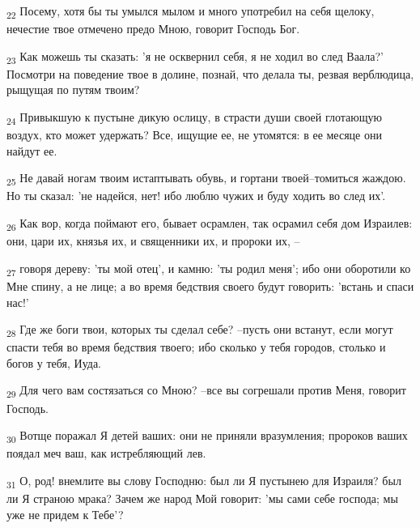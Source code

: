 \begin{tcolorbox}
\textsubscript{22} Посему, хотя бы ты умылся мылом и много употребил на себя щелоку, нечестие твое отмечено предо Мною, говорит Господь Бог.
\end{tcolorbox}
\begin{tcolorbox}
\textsubscript{23} Как можешь ты сказать: 'я не осквернил себя, я не ходил во след Ваала?' Посмотри на поведение твое в долине, познай, что делала ты, резвая верблюдица, рыщущая по путям твоим?
\end{tcolorbox}
\begin{tcolorbox}
\textsubscript{24} Привыкшую к пустыне дикую ослицу, в страсти души своей глотающую воздух, кто может удержать? Все, ищущие ее, не утомятся: в ее месяце они найдут ее.
\end{tcolorbox}
\begin{tcolorbox}
\textsubscript{25} Не давай ногам твоим истаптывать обувь, и гортани твоей--томиться жаждою. Но ты сказал: 'не надейся, нет! ибо люблю чужих и буду ходить во след их'.
\end{tcolorbox}
\begin{tcolorbox}
\textsubscript{26} Как вор, когда поймают его, бывает осрамлен, так осрамил себя дом Израилев: они, цари их, князья их, и священники их, и пророки их, --
\end{tcolorbox}
\begin{tcolorbox}
\textsubscript{27} говоря дереву: 'ты мой отец', и камню: 'ты родил меня'; ибо они оборотили ко Мне спину, а не лице; а во время бедствия своего будут говорить: 'встань и спаси нас!'
\end{tcolorbox}
\begin{tcolorbox}
\textsubscript{28} Где же боги твои, которых ты сделал себе? --пусть они встанут, если могут спасти тебя во время бедствия твоего; ибо сколько у тебя городов, столько и богов у тебя, Иуда.
\end{tcolorbox}
\begin{tcolorbox}
\textsubscript{29} Для чего вам состязаться со Мною? --все вы согрешали против Меня, говорит Господь.
\end{tcolorbox}
\begin{tcolorbox}
\textsubscript{30} Вотще поражал Я детей ваших: они не приняли вразумления; пророков ваших поядал меч ваш, как истребляющий лев.
\end{tcolorbox}
\begin{tcolorbox}
\textsubscript{31} О, род! внемлите вы слову Господню: был ли Я пустынею для Израиля? был ли Я страною мрака? Зачем же народ Мой говорит: 'мы сами себе господа; мы уже не придем к Тебе'?
\end{tcolorbox}

